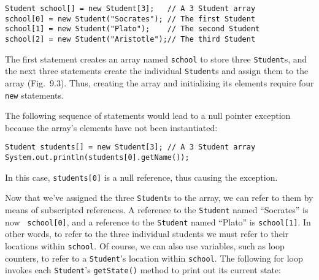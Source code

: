 \begin{jjjlisting}
\begin{lstlisting}
Student school[] = new Student[3];   // A 3 Student array
school[0] = new Student("Socrates"); // The first Student
school[1] = new Student("Plato");    // The second Student
school[2] = new Student("Aristotle");// The third Student
\end{lstlisting}
\end{jjjlisting}

\noindent The first statement creates an array named {\tt school}
to store three \mbox{\tt Student}s, and the next three statements create
the individual {\tt Student}s and assign them to the array
(Fig.~9.3).  Thus, creating the array and initializing
its elements require four {\tt new} statements.

The following sequence of statements would lead to a null pointer
exception because the array's elements have not been instantiated:

\begin{jjjlisting}
\begin{lstlisting}
Student students[] = new Student[3]; // A 3 Student array
System.out.println(students[0].getName());
\end{lstlisting}
\end{jjjlisting}

\noindent In this case, {\tt students[0]} is a null reference, thus
causing the exception.


\noindent Now that we've assigned the three {\tt Student}s to
the array, we can refer to them by means of subscripted references.  A
reference to the \mbox{\tt Student} named ``Socrates'' is now {\tt
school[0]}, and a reference to the \mbox{\tt Student} named ``Plato''
is {\tt school[1]}. In other words, to refer to the three individual
students we must refer to their locations within {\tt school}. Of
course, we can also use variables, such as loop counters, to refer to
a {\tt Student}'s location within {\tt school}. The following for loop
invokes each {\tt Student}'s {\tt getState()} method to print out its
current state:

